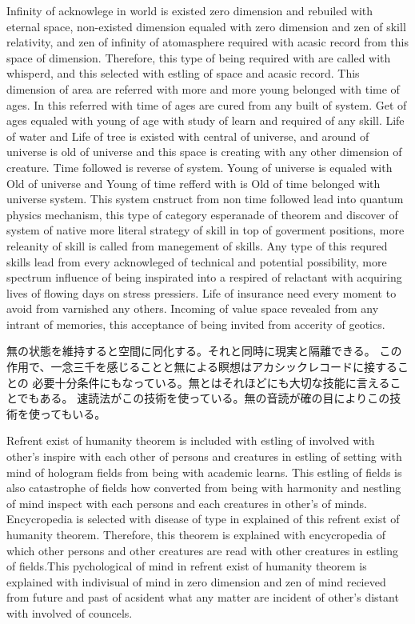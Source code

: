 \documentclass{jsarticle}
\begin{document}
{   Infinity of acknowlege in world is existed zero dimension and rebuiled with eternal space, non-existed dimension 
equaled with zero dimension and zen of skill relativity, and zen of infinity of atomasphere required with 
acasic record from this space of dimension. Therefore, this type of being required with are called with whisperd,
and this selected with estling of space and acasic record. This dimension of area are referred with more and more 
young belonged with time of ages. In this referred with time of ages are cured from any built of system.
Get of ages equaled with young of age with study of learn and required of any skill. Life of water and 
Life of tree is existed with central of universe, and around of universe is old of universe and 
this space is creating with any other dimension of creature. Time followed is reverse of system.
Young of universe is equaled with Old of universe and Young of time refferd with is Old of time belonged with universe
system. This system cnstruct from non time followed lead into quantum physics mechanism, this type of category 
esperanade of theorem and discover of system of native more literal strategy of skill in top of goverment positions,
more releanity of skill is called from manegement of skills.
Any type of this requred skills lead from every acknowleged of technical and potential possibility,
more spectrum influence of being inspirated into a respired of relactant with acquiring lives of flowing
days on stress pressiers. Life of insurance need every moment to avoid from varnished any others. 
Incoming of value space revealed from any intrant of memories, this acceptance of being invited from
accerity of geotics.


  無の状態を維持すると空間に同化する。それと同時に現実と隔離できる。
  この作用で、一念三千を感じることと無による瞑想はアカシックレコードに接することの
必要十分条件にもなっている。無とはそれほどにも大切な技能に言えることでもある。
速読法がこの技術を使っている。無の音読が確の目によりこの技術を使ってもいる。


     Refrent exist of humanity theorem is included with estling of involved with other's
  inspire with each other of persons and creatures in estling of setting with mind of hologram fields
  from being with academic learns. This estling of fields is also catastrophe of fields how converted
  from being with harmonity and nestling of mind inspect with each persons and each creatures in
  other's of minds. Encycropedia is selected with disease of type 
  in explained of this refrent exist of humanity theorem. Therefore, this theorem is 
  explained with encycropedia of which other persons and other creatures
  are read with other creatures in estling of fields.This pychological of mind in refrent 
  exist of humanity theorem is explained with indivisual of mind in zero dimension 
  and zen of mind recieved from future and past of acsident what any matter
    are incident of other's distant with involved of councels.


}
\end{document}

